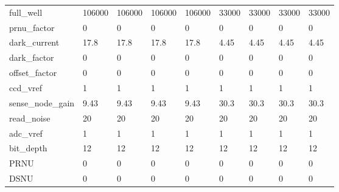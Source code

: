 \begin{tabular}{lllllllll}
full\_well              &            106000 &            106000 &            106000 &            106000 &             33000 &             33000 &             33000 &             33000 \\
prnu\_factor            &                 0 &                 0 &                 0 &                 0 &                 0 &                 0 &                 0 &                 0 \\
dark\_current           &              17.8 &              17.8 &              17.8 &              17.8 &              4.45 &              4.45 &              4.45 &              4.45 \\
dark\_factor            &                 0 &                 0 &                 0 &                 0 &                 0 &                 0 &                 0 &                 0 \\
offset\_factor          &                 0 &                 0 &                 0 &                 0 &                 0 &                 0 &                 0 &                 0 \\
ccd\_vref               &                 1 &                 1 &                 1 &                 1 &                 1 &                 1 &                 1 &                 1 \\
sense\_node\_gain        &              9.43 &              9.43 &              9.43 &              9.43 &              30.3 &              30.3 &              30.3 &              30.3 \\
read\_noise             &                20 &                20 &                20 &                20 &                20 &                20 &                20 &                20 \\
adc\_vref               &                 1 &                 1 &                 1 &                 1 &                 1 &                 1 &                 1 &                 1 \\
bit\_depth              &                12 &                12 &                12 &                12 &                12 &                12 &                12 &                12 \\
PRNU                   &                 0 &                 0 &                 0 &                 0 &                 0 &                 0 &                 0 &                 0 \\
DSNU                   &                 0 &                 0 &                 0 &                 0 &                 0 &                 0 &                 0 &                 0 \\

\end{tabular}

